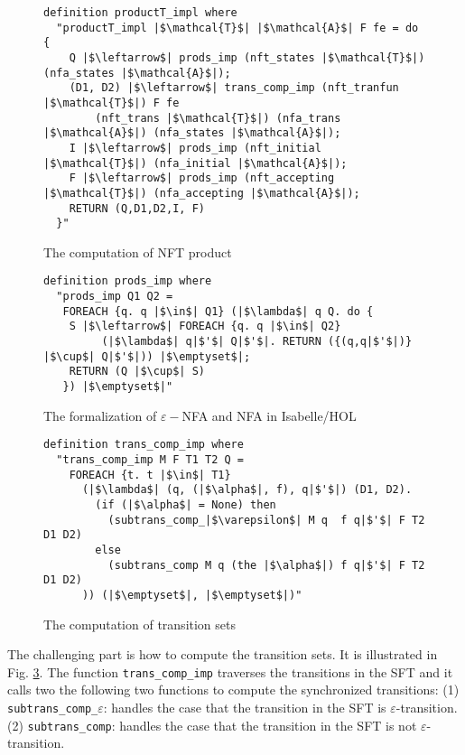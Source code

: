 \documentclass[a4paper,UKenglish,cleveref, autoref, anonymous, thm-restate]{lipics-v2021}
\begin{document}
\begin{figure}[hbt!]
	\begin{lstlisting}
definition productT_impl where
  "productT_impl |$\mathcal{T}$| |$\mathcal{A}$| F fe = do {
    Q |$\leftarrow$| prods_imp (nft_states |$\mathcal{T}$|) (nfa_states |$\mathcal{A}$|);
    (D1, D2) |$\leftarrow$| trans_comp_imp (nft_tranfun |$\mathcal{T}$|) F fe 
        (nft_trans |$\mathcal{T}$|) (nfa_trans |$\mathcal{A}$|) (nfa_states |$\mathcal{A}$|);
    I |$\leftarrow$| prods_imp (nft_initial |$\mathcal{T}$|) (nfa_initial |$\mathcal{A}$|);
    F |$\leftarrow$| prods_imp (nft_accepting |$\mathcal{T}$|) (nfa_accepting |$\mathcal{A}$|);
    RETURN (Q,D1,D2,I, F)
  }"
\end{lstlisting}
\caption{The computation of NFT product}
\label{fig-compute-nft-product}
\end{figure}



\begin{figure}[hbt!]
	\begin{lstlisting}
definition prods_imp where
  "prods_imp Q1 Q2 =
   FOREACH {q. q |$\in$| Q1} (|$\lambda$| q Q. do {
    S |$\leftarrow$| FOREACH {q. q |$\in$| Q2}
         (|$\lambda$| q|$'$| Q|$'$|. RETURN ({(q,q|$'$|)} |$\cup$| Q|$'$|)) |$\emptyset$|;
    RETURN (Q |$\cup$| S)
   }) |$\emptyset$|"
\end{lstlisting}
\caption{The formalization of $\varepsilon-$NFA and NFA in Isabelle/HOL}
\label{fig-def-prods_imp}
\end{figure}



\begin{figure}[hbt!]
	\begin{lstlisting}
definition trans_comp_imp where
  "trans_comp_imp M F T1 T2 Q =
    FOREACH {t. t |$\in$| T1}
      (|$\lambda$| (q, (|$\alpha$|, f), q|$'$|) (D1, D2). 
        (if (|$\alpha$| = None) then 
          (subtrans_comp_|$\varepsilon$| M q  f q|$'$| F T2 D1 D2)
        else 
          (subtrans_comp M q (the |$\alpha$|) f q|$'$| F T2 D1 D2)
      )) (|$\emptyset$|, |$\emptyset$|)"
\end{lstlisting}
\caption{The computation of transition sets}
\label{fig-def-prods-imp}
\end{figure}

The challenging part is how to compute the transition sets. It is illustrated in Fig. \ref{fig-def-prods-imp}. The function \texttt{trans\_comp\_imp} traverses the transitions in the SFT and it calls two the following two functions to compute the synchronized transitions:
(1) \texttt{subtrans\_comp\_$\varepsilon$}: handles the case that the transition in the SFT is $\varepsilon$-transition.
(2) \texttt{subtrans\_comp}: handles the case that the transition in the SFT is not $\varepsilon$-transition.
\end{document}
